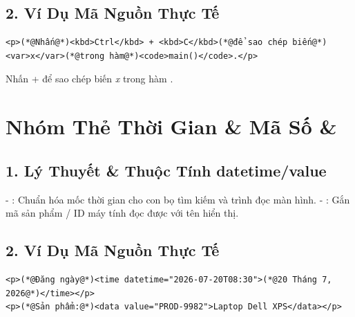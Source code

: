 \subsection{2. Ví Dụ Mã Nguồn Thực Tế}
\begin{codeWindow}
\begin{lstlisting}[language=HTML5]
<p>(*@Nhấn@*)<kbd>Ctrl</kbd> + <kbd>C</kbd>(*@để sao chép biến@*)<var>x</var>(*@trong hàm@*)<code>main()</code>.</p>
\end{lstlisting}
\end{codeWindow}

\begin{browserWindow}
\sffamily\small
Nhấn  +  để sao chép biến \textit{x} trong hàm .
\end{browserWindow}

\section{Nhóm Thẻ Thời Gian \& Mã Số  \& }
\subsection{1. Lý Thuyết \& Thuộc Tính datetime/value}
- : Chuẩn hóa mốc thời gian cho con bọ tìm kiếm và trình đọc màn hình.
- : Gắn mã sản phẩm / ID máy tính đọc được với tên hiển thị.

\subsection{2. Ví Dụ Mã Nguồn Thực Tế}
\begin{codeWindow}
\begin{lstlisting}[language=HTML5]
<p>(*@Đăng ngày@*)<time datetime="2026-07-20T08:30">(*@20 Tháng 7, 2026@*)</time></p>
<p>(*@Sản phẩm:@*)<data value="PROD-9982">Laptop Dell XPS</data></p>
\end{lstlisting}
\end{codeWindow}

